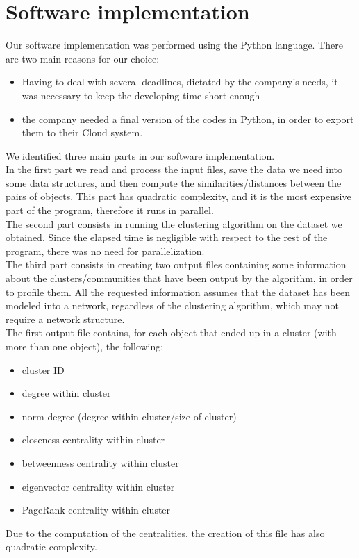 \documentclass[a4paper,11pt]{book}
\begin{document}
\section{Software implementation}\label{sec:impl}
Our software implementation was performed using the Python language. There are two main reasons for our choice:
\begin{itemize}
\item Having to deal with several deadlines, dictated by the company's needs, it was necessary to keep the developing time short enough
\item the company needed a final version of the codes in Python, in order to export them to their Cloud system.
\end{itemize}
We identified three main parts in our software implementation.\\
In the first part we read and process the input files, save the data we need into some data structures, and then compute the similarities/distances between the pairs of objects. This part has quadratic complexity, and it is the most expensive part of the program, therefore it runs in parallel.\\
The second part consists in running the clustering algorithm on the dataset we obtained. Since the elapsed time is negligible with respect to the rest of the program, there was no need for parallelization.\\
The third part consists in creating two output files containing some information about the clusters/communities that have been output by the algorithm, in order to profile them. All the requested information assumes that the dataset has been modeled into a network, regardless of the clustering algorithm, which may not require a network structure.\\
The first output file contains, for each object that ended up in a cluster (with more than one object), the following:
\begin{itemize}
\item cluster ID
\item degree within cluster
\item norm degree (degree within cluster/size of cluster)
\item closeness centrality within cluster
\item betweenness centrality within cluster
\item eigenvector centrality within cluster
\item PageRank centrality within cluster
\end{itemize}
Due to the computation of the centralities, the creation of this file has also quadratic complexity.\\
\end{document}
